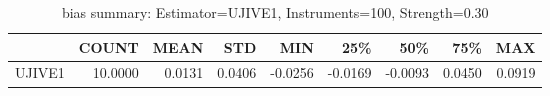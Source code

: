 \begin{table}[ht]
\centering
\caption{bias summary: Estimator=UJIVE1, Instruments=100, Strength=0.30}
\begin{tabular}{lrrrrrrrr}
\toprule
 & COUNT & MEAN & STD & MIN & 25\% & 50\% & 75\% & MAX \\
\midrule
UJIVE1 & 10.0000 & 0.0131 & 0.0406 & -0.0256 & -0.0169 & -0.0093 & 0.0450 & 0.0919 \\
\bottomrule
\end{tabular}
\end{table}
